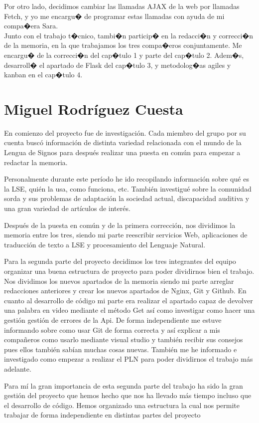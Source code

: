 Por otro lado, decidimos cambiar las llamadas AJAX de la web  por llamadas Fetch, y yo me encargu� de programar estas llamadas con ayuda de mi compa�era Sara. \\

Junto con el trabajo t�cnico, tambi�n particip� en la redacci�n y correcci�n  de la memoria, en la que trabajamos los tres compa�eros conjuntamente. Me encargu� de la correcci�n del cap�tulo 1 y parte del cap�tulo 2. Adem�s, desarroll� el apartado de Flask del cap�tulo 3,  y metodolog�as agiles y kanban en el cap�tulo 4.\\
\section{Miguel Rodríguez Cuesta}
\label{capTrabajoIndividual:sec:Miguel}

En comienzo del proyecto fue de investigación. Cada miembro del grupo por su cuenta buscó información de distinta variedad relacionada con el mundo de la Lengua de Signos para después realizar una puesta en común para empezar a redactar la memoria.

Personalmente durante este período he ido recopilando información sobre qué es la LSE, quién la usa, como funciona, etc. También investigué sobre la comunidad sorda y sus problemas de adaptación la sociedad actual, discapacidad auditiva y una gran variedad de artículos de interés.

Después de la puesta en común y de la primera corrección, nos dividimos la memoria entre los tres, siendo mi parte reescribir servicios Web, aplicaciones de traducción de texto a LSE y procesamiento del Lenguaje Natural.

Para la segunda parte del proyecto decidimos los tres integrantes del equipo organizar una buena estructura de proyecto para poder dividirnos bien el trabajo.
Nos dividimos los nuevos apartados de la memoria siendo mi parte arreglar redacciones anteriores y crear los nuevos apartados de Nginx, Git y Github.
En cuanto al desarrollo de código mi parte era realizar el apartado capaz de devolver una palabra en video mediante el método Get así como investigar como hacer  una gestión gestión de errores de la Api. De forma independiente me estuve informando sobre como usar Git de forma correcta y así explicar a mis compañeros como usarlo mediante visual studio y también recibir sus consejos pues ellos también sabían muchas cosas nuevas. También me he informado e investigado como empezar a realizar el PLN para poder dividirnos el trabajo más adelante.

Para mí la gran importancia de esta segunda parte del trabajo ha sido la gran gestión del proyecto que hemos hecho que nos ha llevado más tiempo incluso que el desarrollo de código. Hemos organizado una estructura la cual nos permite trabajar de forma independiente en distintas partes del proyecto


